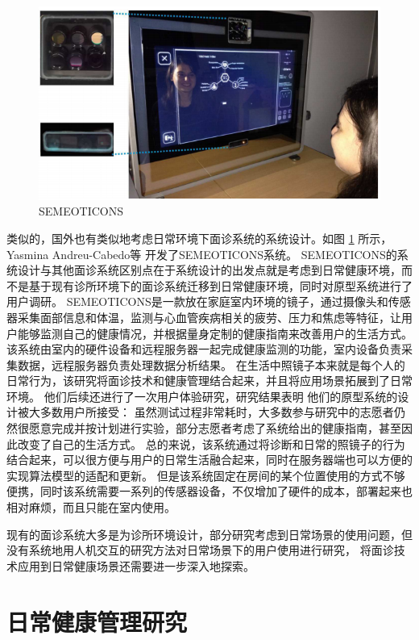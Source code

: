 \begin{figure}[h]
    \centering
    \includegraphics[width=12cm]{images/mirror.png}
    \caption{SEMEOTICONS\cite{andreu2015mirror}}
    \label{fig:seme}
\end{figure}
类似的，国外也有类似地考虑日常环境下面诊系统的系统设计。如图 \ref{fig:seme} 所示，Yasmina Andreu-Cabedo等 \cite{andreu2015mirror}开发了SEMEOTICONS系统。
SEMEOTICONS的系统设计与其他面诊系统区别点在于系统设计的出发点就是考虑到日常健康环境，而不是基于现有诊所环境下的面诊系统迁移到日常健康环境，同时对原型系统进行了用户调研。
SEMEOTICONS是一款放在家庭室内环境的镜子，通过摄像头和传感器采集面部信息和体温，监测与心血管疾病相关的疲劳、压力和焦虑等特征，让用户能够监测自己的健康情况，并根据量身定制的健康指南来改善用户的生活方式。
该系统由室内的硬件设备和远程服务器一起完成健康监测的功能，室内设备负责采集数据，远程服务器负责处理数据分析结果。
在生活中照镜子本来就是每个人的日常行为，该研究将面诊技术和健康管理结合起来，并且将应用场景拓展到了日常环境。
他们后续还进行了一次用户体验研究，研究结果表明\cite{coppini2017user} 他们的原型系统的设计被大多数用户所接受： 虽然测试过程非常耗时，大多数参与研究中的志愿者仍然很愿意完成并按计划进行实验，部分志愿者考虑了系统给出的健康指南，甚至因此改变了自己的生活方式。
总的来说，该系统通过将诊断和日常的照镜子的行为结合起来，可以很方便与用户的日常生活融合起来，同时在服务器端也可以方便的实现算法模型的适配和更新。
但是该系统固定在房间的某个位置使用的方式不够便携，同时该系统需要一系列的传感器设备，不仅增加了硬件的成本，部署起来也相对麻烦，而且只能在室内使用。

现有的面诊系统大多是为诊所环境设计，部分研究考虑到日常场景的使用问题，但没有系统地用人机交互的研究方法对日常场景下的用户使用进行研究，
将面诊技术应用到日常健康场景还需要进一步深入地探索。

\section{日常健康管理研究}

